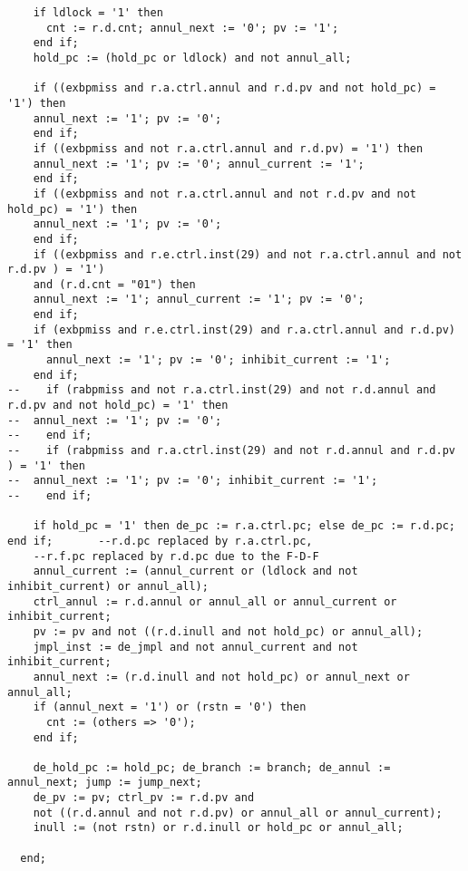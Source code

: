 \begin{lstlisting}
    if ldlock = '1' then
      cnt := r.d.cnt; annul_next := '0'; pv := '1';
    end if;
    hold_pc := (hold_pc or ldlock) and not annul_all;

    if ((exbpmiss and r.a.ctrl.annul and r.d.pv and not hold_pc) = '1') then
	annul_next := '1'; pv := '0';
    end if;
    if ((exbpmiss and not r.a.ctrl.annul and r.d.pv) = '1') then
	annul_next := '1'; pv := '0'; annul_current := '1';
    end if;
    if ((exbpmiss and not r.a.ctrl.annul and not r.d.pv and not hold_pc) = '1') then
	annul_next := '1'; pv := '0';
    end if;
    if ((exbpmiss and r.e.ctrl.inst(29) and not r.a.ctrl.annul and not r.d.pv ) = '1') 
	and (r.d.cnt = "01") then
	annul_next := '1'; annul_current := '1'; pv := '0';
    end if;
    if (exbpmiss and r.e.ctrl.inst(29) and r.a.ctrl.annul and r.d.pv) = '1' then
      annul_next := '1'; pv := '0'; inhibit_current := '1';
    end if; 
--    if (rabpmiss and not r.a.ctrl.inst(29) and not r.d.annul and r.d.pv and not hold_pc) = '1' then
--	annul_next := '1'; pv := '0';
--    end if;
--    if (rabpmiss and r.a.ctrl.inst(29) and not r.d.annul and r.d.pv ) = '1' then
--	annul_next := '1'; pv := '0'; inhibit_current := '1';
--    end if;

    if hold_pc = '1' then de_pc := r.a.ctrl.pc; else de_pc := r.d.pc; end if;		--r.d.pc replaced by r.a.ctrl.pc,
	--r.f.pc replaced by r.d.pc due to the F-D-F
    annul_current := (annul_current or (ldlock and not inhibit_current) or annul_all);
    ctrl_annul := r.d.annul or annul_all or annul_current or inhibit_current;
    pv := pv and not ((r.d.inull and not hold_pc) or annul_all);
    jmpl_inst := de_jmpl and not annul_current and not inhibit_current;
    annul_next := (r.d.inull and not hold_pc) or annul_next or annul_all;
    if (annul_next = '1') or (rstn = '0') then
      cnt := (others => '0'); 
    end if;

    de_hold_pc := hold_pc; de_branch := branch; de_annul := annul_next; jump := jump_next;
    de_pv := pv; ctrl_pv := r.d.pv and 
	not ((r.d.annul and not r.d.pv) or annul_all or annul_current);
    inull := (not rstn) or r.d.inull or hold_pc or annul_all;

  end;
\end{lstlisting}